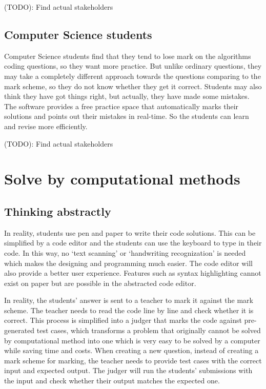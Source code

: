 \documentclass{report}
\begin{document}
(TODO): Find actual stakeholders

\subsection{Computer Science students}

Computer Science students find that they tend to lose mark on the algorithms coding questions, so they want more practice. But unlike ordinary questions, they may take a completely different approach towards the questions comparing to the mark scheme, so they do not know whether they get it correct. Students may also think they have got things right, but actually, they have made some mistakes. The software provides a free practice space that automatically marks their solutions and points out their mistakes in real-time. So the students can learn and revise more efficiently.

(TODO): Find actual stakeholders

\section{Solve by computational methods}

\subsection{Thinking abstractly}

In reality, students use pen and paper to write their code solutions. This can be simplified by a code editor and the students can use the keyboard to type in their code. In this way, no `text scanning' or `handwriting recognization' is needed which makes the designing and programming much easier. The code editor will also provide a better user experience. Features such as syntax highlighting cannot exist on paper but are possible in the abstracted code editor.

In reality, the students' answer is sent to a teacher to mark it against the mark scheme. The teacher needs to read the code line by line and check whether it is correct. This process is simplified into a judger that marks the code against pre-generated test cases, which transforms a problem that originally cannot be solved by computational method into one which is very easy to be solved by a computer while saving time and costs. When creating a new question, instead of creating a mark scheme for marking, the teacher needs to provide test cases with the correct input and expected output. The judger will run the students' submissions with the input and check whether their output matches the expected one.
\end{document}
